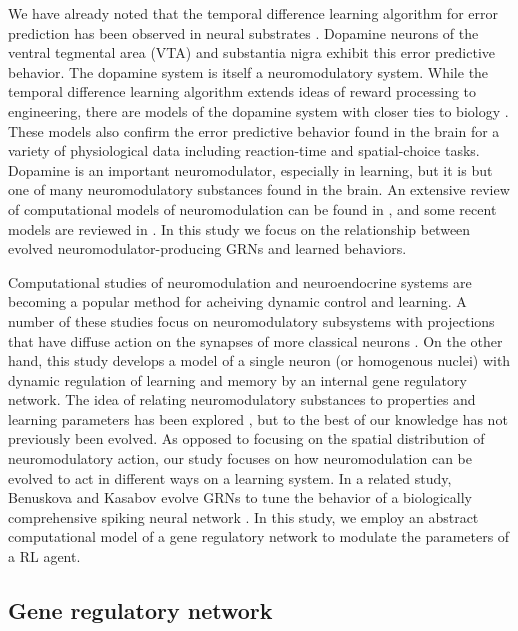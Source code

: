 \documentclass[conference]{IEEEtran}
\begin{document}

We have already noted that the temporal difference learning algorithm for error
prediction has been observed in neural substrates \cite{Schultz1993}.
Dopamine neurons of the ventral tegmental area (VTA) and substantia nigra
exhibit this error predictive behavior. The dopamine system is itself a 
neuromodulatory system. While the temporal difference learning algorithm
extends ideas of reward processing to engineering, there are models of
the dopamine system with closer ties to biology \cite{Montague1996}. These
models also confirm the error predictive behavior found in the brain for a
variety of physiological data including reaction-time and spatial-choice
tasks. Dopamine is an important neuromodulator, especially in learning, but
it is but one of many neuromodulatory substances found in the brain. An
extensive review of computational models of neuromodulation can be found in
\cite{Fellous1998}, and some recent models are reviewed in \cite{Marder2012}.
In this study we focus on the relationship between evolved neuromodulator-producing
GRNs and learned behaviors. 

Computational studies of neuromodulation and neuroendocrine systems are 
becoming a popular method for acheiving dynamic control and learning. A
number of these studies focus on neuromodulatory subsystems with projections
that have diffuse action on the synapses of more classical neurons
\cite{Sporns2002,Risi2009,Soltoggio2008,Pitonakova2013}. On the other hand, this
study develops a model of a single neuron (or homogenous nuclei) with dynamic
regulation of learning and memory by an internal gene regulatory network. The
idea of relating neuromodulatory substances to properties and learning
parameters has been explored \cite{Doya2002,Krichmar2008}, but to the best of
our knowledge has not previously been evolved. As opposed to focusing on
the spatial distribution of neuromodulatory action, our study focuses on
how neuromodulation can be evolved to act in different ways on a learning system.
In a related study, Benuskova and Kasabov evolve GRNs to tune the behavior of a
biologically comprehensive spiking neural network \cite{Benuskova2008}.
In this study, we employ an abstract computational model of a gene regulatory
network to modulate the parameters of a RL agent.

\subsection{Gene regulatory network}
\end{document}
